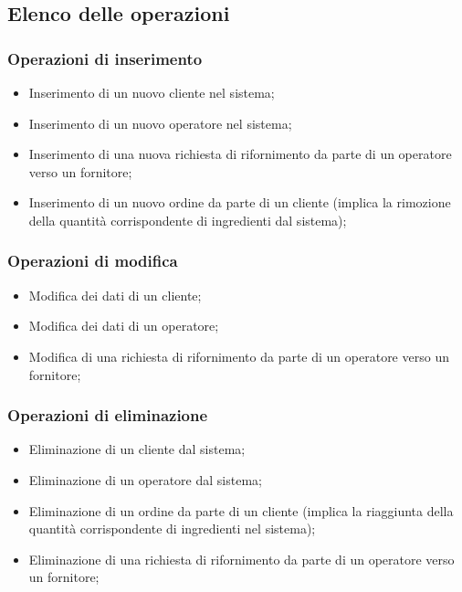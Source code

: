 \documentclass[12pt,a4paper]{article}
\begin{document}
    \subsection{Elenco delle operazioni}
    \subsubsection{Operazioni di inserimento}
    \begin{itemize}[leftmargin=1em]
        \item Inserimento di un nuovo cliente nel sistema;
        \item Inserimento di un nuovo operatore nel sistema;
        \item Inserimento di una nuova richiesta di rifornimento da parte di un operatore verso un fornitore;
        \item Inserimento di un nuovo ordine da parte di un cliente (implica la rimozione della quantità corrispondente di ingredienti dal sistema);
    \end{itemize}

    \subsubsection{Operazioni di modifica}
    \begin{itemize}[leftmargin=1em]
        \item Modifica dei dati di un cliente;
        \item Modifica dei dati di un operatore;
        \item Modifica di una richiesta di rifornimento da parte di un operatore verso un fornitore;
    \end{itemize}

    \subsubsection{Operazioni di eliminazione}
    \begin{itemize}[leftmargin=1em]
        \item Eliminazione di un cliente dal sistema;
        \item Eliminazione di un operatore dal sistema;
        \item Eliminazione di un ordine da parte di un cliente (implica la riaggiunta della quantità corrispondente di ingredienti nel sistema);
        \item Eliminazione di una richiesta di rifornimento da parte di un operatore verso un fornitore;
    \end{itemize}
\end{document}
